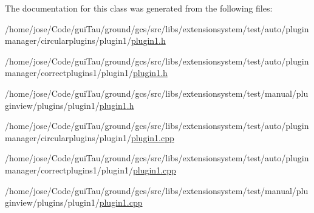 The documentation for this class was generated from the following files\-:\begin{DoxyCompactItemize}
\item 
/home/jose/\-Code/gui\-Tau/ground/gcs/src/libs/extensionsystem/test/auto/pluginmanager/circularplugins/plugin1/\hyperlink{auto_2pluginmanager_2circularplugins_2plugin1_2plugin1_8h}{plugin1.\-h}\item 
/home/jose/\-Code/gui\-Tau/ground/gcs/src/libs/extensionsystem/test/auto/pluginmanager/correctplugins1/plugin1/\hyperlink{auto_2pluginmanager_2correctplugins1_2plugin1_2plugin1_8h}{plugin1.\-h}\item 
/home/jose/\-Code/gui\-Tau/ground/gcs/src/libs/extensionsystem/test/manual/pluginview/plugins/plugin1/\hyperlink{manual_2pluginview_2plugins_2plugin1_2plugin1_8h}{plugin1.\-h}\item 
/home/jose/\-Code/gui\-Tau/ground/gcs/src/libs/extensionsystem/test/auto/pluginmanager/circularplugins/plugin1/\hyperlink{auto_2pluginmanager_2circularplugins_2plugin1_2plugin1_8cpp}{plugin1.\-cpp}\item 
/home/jose/\-Code/gui\-Tau/ground/gcs/src/libs/extensionsystem/test/auto/pluginmanager/correctplugins1/plugin1/\hyperlink{auto_2pluginmanager_2correctplugins1_2plugin1_2plugin1_8cpp}{plugin1.\-cpp}\item 
/home/jose/\-Code/gui\-Tau/ground/gcs/src/libs/extensionsystem/test/manual/pluginview/plugins/plugin1/\hyperlink{manual_2pluginview_2plugins_2plugin1_2plugin1_8cpp}{plugin1.\-cpp}\end{DoxyCompactItemize}
